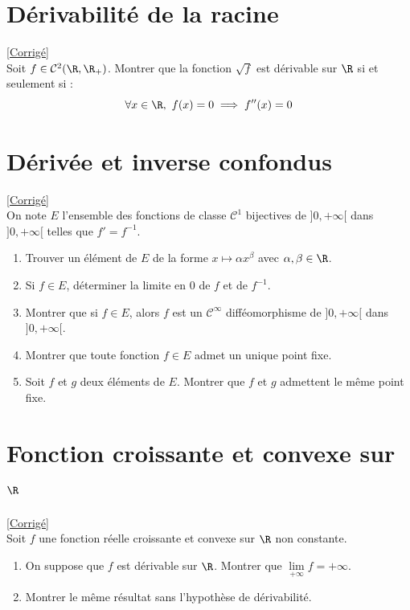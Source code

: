 \documentclass{book}
\begin{document}
	\section{Dérivabilité de la racine }
	\textcolor{blue}{\hyperref[Dérivabilité de la racine corrigé]{[Corrigé]}}\\
	\label{Dérivabilité de la racine}
	Soit $f\in \mathcal C^2(\R,\R_+)$. Montrer que la fonction $\sqrt f$ est dérivable sur $\R$ si et seulement si :
	$$\forall x\in \R,\ f(x)=0\implies f''(x)=0$$
	
	\section{Dérivée et inverse confondus }
	\textcolor{blue}{\hyperref[Dérivée et inverse confondus corrigé]{[Corrigé]}}\\
	\label{Dérivée et inverse confondus}
	On note $E$ l'ensemble des fonctions de classe $\mathcal{C}^1$ bijectives de $]0,+\infty[$ dans $]0,+\infty[$ telles que $f'=f^{-1}$.
	\begin{enumerate}
		\item Trouver un élément de $E$ de la forme $x\mapsto\alpha x^{\beta}$ avec $\alpha , \beta \in \R$.
		\item Si $f\in E$, déterminer la limite en 0 de $f$ et de $f^{-1}$.
		\item Montrer que si $f\in E$, alors $f$ est un $\mathcal{C}^{\infty}$ difféomorphisme de $]0,+\infty[$ dans $]0,+\infty[$.
		\item Montrer que toute fonction $f\in E$ admet un unique point fixe.
		\item Soit $f$ et $g$ deux éléments de $E$. Montrer que $f$ et $g$ admettent le même point fixe.
	\end{enumerate}
	
	\section{Fonction croissante et convexe sur $\R$ }
	\textcolor{blue}{\hyperref[Fonction croissante et convexe sur R corrigé]{[Corrigé]}}\\
	\label{Fonction croissante et convexe sur R}
	Soit $f$ une fonction réelle croissante et convexe sur $\R$ non constante.
	\begin{enumerate}
		\item On suppose que $f$ est dérivable sur $\R$. Montrer que $\lim\limits_{+\infty}f=+\infty$.
		\item Montrer le même résultat sans l'hypothèse de dérivabilité.
	\end{enumerate}
	
\end{document}

